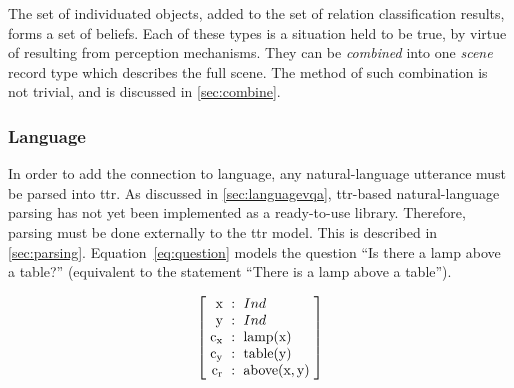 The set of individuated objects, added to the set of relation classification results, forms a set of beliefs.
Each of these types is a situation held to be true, by virtue of resulting from perception mechanisms.
They can be \textit{combined} into one \textit{scene} record type which describes the full scene.
The method of such combination is not trivial, and is discussed in \autoref{sec:combine}.



\subsubsection{Language}
\label{sec:ttrlanguage}

%

In order to add the  connection to language, any natural-language utterance must be parsed into \gls{ttr}.
As discussed in \autoref{sec:languagevqa}, \gls{ttr}-based natural-language parsing has not yet been implemented as a ready-to-use library.
Therefore, parsing must be done externally to the \gls{ttr} model.
This is described in \autoref{sec:parsing}.
Equation~\ref{eq:question} models the question ``Is there a lamp above a table?'' (equivalent to the statement ``There is a lamp above a table'').

\begin{equation}\label{eq:question}
\rec{
    \text{x} &:& Ind \\
    \text{y} &:& Ind \\
    \text{c}_\text{x} &:& \text{lamp}(\text{x}) \\
    \text{c}_\text{y} &:& \text{table}(\text{y}) \\
    \text{c}_\text{r} &:& \text{above}(\text{x}, \text{y}) \\
    }
\end{equation}

